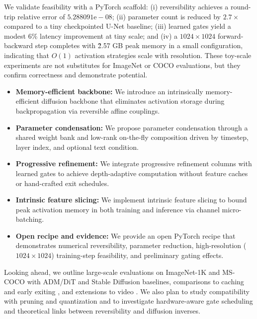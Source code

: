 \documentclass{article}
\begin{document}
We validate feasibility with a PyTorch scaffold: (i) reversibility achieves a round-trip relative error of $5.288091\mathrm{e}{-}08$; (ii) parameter count is reduced by $2.7\times$ compared to a tiny checkpointed U-Net baseline; (iii) learned gates yield a modest 6\% latency improvement at tiny scale; and (iv) a $1024\times 1024$ forward-backward step completes with \~2.57 GB peak memory in a small configuration, indicating that $O(1)$ activation strategies scale with resolution. These toy-scale experiments are not substitutes for ImageNet or COCO evaluations, but they confirm correctness and demonstrate potential.

\begin{itemize}
\item \textbf{Memory-efficient backbone:} We introduce an intrinsically memory-efficient diffusion backbone that eliminates activation storage during backpropagation via reversible affine couplings.
\item \textbf{Parameter condensation:} We propose parameter condensation through a shared weight bank and low-rank on-the-fly composition driven by timestep, layer index, and optional text condition.
\item \textbf{Progressive refinement:} We integrate progressive refinement columns with learned gates to achieve depth-adaptive computation without feature caches or hand-crafted exit schedules.
\item \textbf{Intrinsic feature slicing:} We implement intrinsic feature slicing to bound peak activation memory in both training and inference via channel micro-batching.
\item \textbf{Open recipe and evidence:} We provide an open PyTorch recipe that demonstrates numerical reversibility, parameter reduction, high-resolution ($1024\times 1024$) training-step feasibility, and preliminary gating effects.
\end{itemize}

Looking ahead, we outline large-scale evaluations on ImageNet-1K and MS-COCO with ADM/DiT and Stable Diffusion baselines, comparisons to caching and early exiting \cite{dhariwal-2021-diffusion,ma-2023-deepcache,ma-2024-learning,moon-2024-simple,zhan-2024-fast}, and extensions to video \cite{blattmann-2023-align}. We also plan to study compatibility with pruning and quantization \cite{fang-2023-structural,zhu-2024-dip,so-2023-temporal} and to investigate hardware-aware gate scheduling and theoretical links between reversibility and diffusion inverses.
\end{document}
